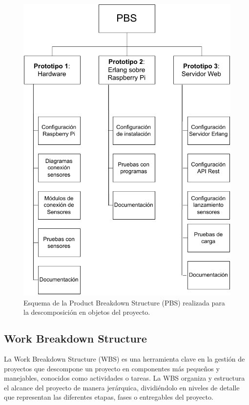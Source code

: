 \begin{figure}[ht]
\centering
\includegraphics[scale=1.2]{images/PBS.pdf}
\caption[PBS del proyecto]{Esquema de la Product Breakdown Structure (PBS) realizada para la descomposición en objetos del proyecto.}%
\label{fig:PBS}
\end{figure}

\subsection{Work Breakdown Structure}

La Work Breakdown Structure (WBS) es una herramienta clave en la gestión de proyectos que descompone un proyecto en componentes más pequeños y manejables, conocidos como actividades o tareas. La WBS organiza y estructura el alcance del proyecto de manera jerárquica, dividiéndolo en niveles de detalle que representan las diferentes etapas, fases o entregables del proyecto.

